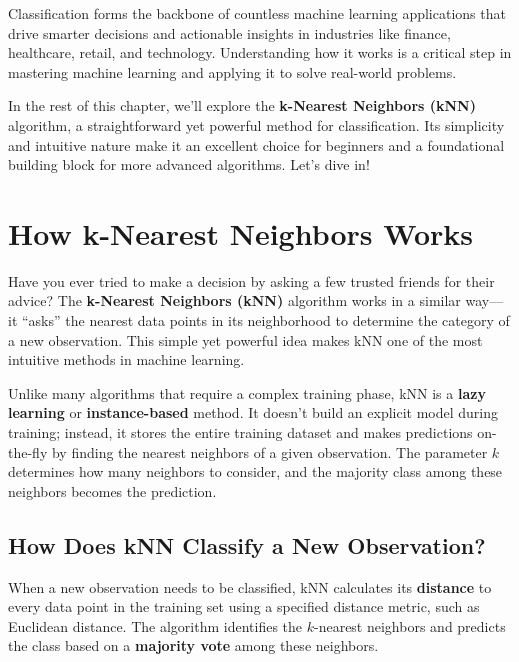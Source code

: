 \documentclass[
]{book}
\theoremstyle{definition}
\theoremstyle{definition}
\theoremstyle{definition}
\theoremstyle{definition}
\theoremstyle{remark}
\begin{document}
Classification forms the backbone of countless machine learning applications that drive smarter decisions and actionable insights in industries like finance, healthcare, retail, and technology. Understanding how it works is a critical step in mastering machine learning and applying it to solve real-world problems.

In the rest of this chapter, we'll explore the \textbf{k-Nearest Neighbors (kNN)} algorithm, a straightforward yet powerful method for classification. Its simplicity and intuitive nature make it an excellent choice for beginners and a foundational building block for more advanced algorithms. Let's dive in!

\section{How k-Nearest Neighbors Works}\label{how-k-nearest-neighbors-works}

Have you ever tried to make a decision by asking a few trusted friends for their advice? The \textbf{k-Nearest Neighbors (kNN)} algorithm works in a similar way---it ``asks'' the nearest data points in its neighborhood to determine the category of a new observation. This simple yet powerful idea makes kNN one of the most intuitive methods in machine learning.

Unlike many algorithms that require a complex training phase, kNN is a \textbf{lazy learning} or \textbf{instance-based} method. It doesn't build an explicit model during training; instead, it stores the entire training dataset and makes predictions on-the-fly by finding the nearest neighbors of a given observation. The parameter \(k\) determines how many neighbors to consider, and the majority class among these neighbors becomes the prediction.

\subsection*{How Does kNN Classify a New Observation?}\label{how-does-knn-classify-a-new-observation}

When a new observation needs to be classified, kNN calculates its \textbf{distance} to every data point in the training set using a specified distance metric, such as Euclidean distance. The algorithm identifies the \(k\)-nearest neighbors and predicts the class based on a \textbf{majority vote} among these neighbors.
\end{document}
